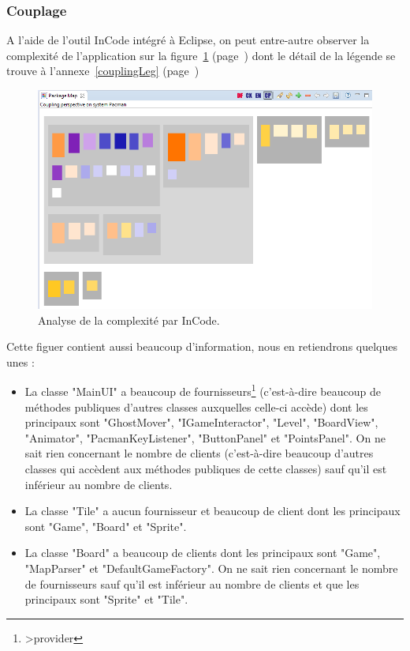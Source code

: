 \documentclass[12pt,a4paper,final]{article}
\newcommand{\annexe}[1]{annexe~\ref{#1} (page~\pageref{#1})}
\newcommand{\labelfigure}[1]{figure~\ref{#1} (page~\pageref{#1})}
\begin{document}
\subsubsection{Couplage}
A l'aide de l'outil InCode intégré à Eclipse, on peut entre-autre observer la complexité de l'application sur la \labelfigure{coupling} dont le détail de la légende se trouve à l'\annexe{couplingLeg}
\begin{figure}[!h]
	\centering
	\includegraphics[width=\textwidth]{InCodeCoupling.png}
	\caption{\label{coupling}Analyse de la complexité par InCode.}
\end{figure}
Cette figuer contient aussi beaucoup d'information, nous en retiendrons quelques unes : 
\begin {itemize}
\item La classe "MainUI" a beaucoup de fournisseurs\footnote{>provider} (c'est-à-dire beaucoup de méthodes publiques d'autres classes auxquelles celle-ci accède) dont les principaux sont "GhostMover", "IGameInteractor", "Level", "BoardView", "Animator", "PacmanKeyListener", "ButtonPanel" et "PointsPanel". On ne sait rien concernant le nombre de clients (c'est-à-dire beaucoup d'autres classes qui accèdent aux méthodes publiques de cette classes) sauf qu'il est inférieur au nombre de clients.
\item La classe "Tile" a aucun fournisseur et beaucoup de client dont les principaux sont "Game", "Board" et "Sprite".
\item La classe "Board" a beaucoup de clients dont les principaux sont "Game", "MapParser" et "DefaultGameFactory". On ne sait rien concernant le nombre de fournisseurs sauf qu'il est inférieur au nombre de clients et que les principaux sont "Sprite" et "Tile".
\end{itemize}
\end{document}
